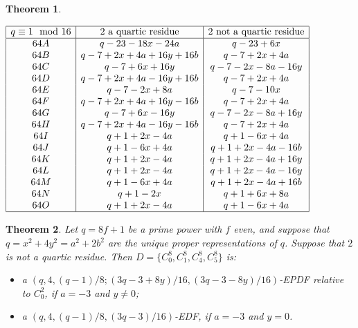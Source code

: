 \documentclass[10pt,a4paper]{amsart}
\newtheorem{theorem}{Theorem}
\begin{document}
\begin{theorem}
\begin{itemize}
$
\begin{array}{|c|c|c|}
\hline
q \equiv 1 \mod 16 &\text{$2$ a quartic residue} &\text{$2$ not a quartic residue}\\
\hline
64A & q-23-18x-24a & q-23+6x \\
64B & q-7+2x+4a+16y+16b & q-7+2x+4a\\
64C & q-7+6x+16y& q-7-2x-8a-16y\\
64D & q-7+2x+4a-16y+16b & q-7+2x+4a\\
64E & q-7-2x+8a & q-7-10x\\
64F & q-7+2x+4a+16y-16b & q-7+2x+4a\\
64G & q-7+6x-16y & q-7-2x-8a+16y\\
64H & q-7+2x+4a-16y-16b & q-7+2x+4a\\
64I & q+1+2x-4a & q+1-6x+4a\\
64J & q+1-6x+4a & q+1+2x-4a-16b\\
64K & q+1+2x-4a  & q+1+2x-4a+16y\\
64L & q+1+2x-4a & q+1+2x-4a-16y\\
64M & q+1-6x+4a & q+1+2x-4a+16b\\
64N & q+1-2x & q+1+6x+8a\\
64O & q+1+2x-4a & q+1-6x+4a\\
\hline
\end{array}
$

\end{itemize}

\end{theorem}

\begin{theorem}\label{thm:EPDF1111}
	Let $q=8f+1$ be a prime power with $f$ even, and suppose that $q=x^2+4y^2=a^2+2b^2$ are the unique proper representations of $q$. Suppose that $2$ is not a
	quartic residue. Then
	$
	 D=\{C_0^8,C_1^8,C_4^8,C_5^8\}
	$ 
	is:
	\begin{itemize}
		\item a
		$
		(q,4,(q-1)/8;(3q-3+8y)/16,(3q-3-8y)/16)
		$-EPDF relative to $C_0^2$, if $a=-3$ and $y\ne0$;
		
		\item a
		$
		(q,4,(q-1)/8,(3q-3)/16)
		$-EDF, if $a=-3$ and $y=0$.
	\end{itemize}
\end{theorem}
\end{document}
